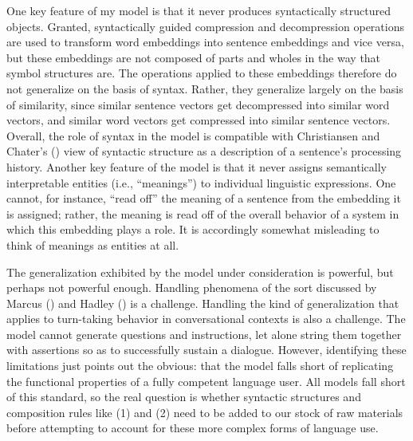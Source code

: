 One key feature of my model is that it never produces syntactically structured objects. Granted, syntactically guided compression and decompression operations are used to transform word embeddings into sentence embeddings and vice versa, but these embeddings are not composed of parts and wholes in the way that symbol structures are. The operations applied to these embeddings therefore do not generalize on the basis of syntax. Rather, they generalize largely on the basis of similarity, since similar sentence vectors get decompressed into similar word vectors, and similar word vectors get compressed into similar sentence vectors. Overall, the role of syntax in the model is compatible with Christiansen and Chater's (\citeyear{Christiansen:2015}) view of syntactic structure as a description of a sentence's processing history. Another key feature of the model is that it never assigns semantically interpretable entities (i.e., ``meanings'') to individual linguistic expressions. One cannot, for instance, ``read off'' the meaning of a sentence from the embedding it is assigned; rather, the meaning is read off of the overall behavior of a system in which this embedding plays a role. It is accordingly somewhat misleading to think of meanings as entities at all.
 
The generalization exhibited by the model under consideration is powerful, but perhaps not powerful enough. Handling phenomena of the sort discussed by Marcus (\citeyear{Marcus:1998}) and Hadley (\citeyear{Hadley:2009}) is a challenge. Handling the kind of generalization that applies to turn-taking behavior in conversational contexts is also a challenge. The model cannot generate questions and instructions, let alone string them together with assertions so as to successfully sustain a dialogue. However, identifying these limitations just points out the obvious: that the model falls short of replicating the functional properties of a fully competent language user. All models fall short of this standard, so the real question is whether syntactic structures and composition rules like (1) and (2) need to be added to our stock of raw materials before attempting to account for these more complex forms of language use. 


